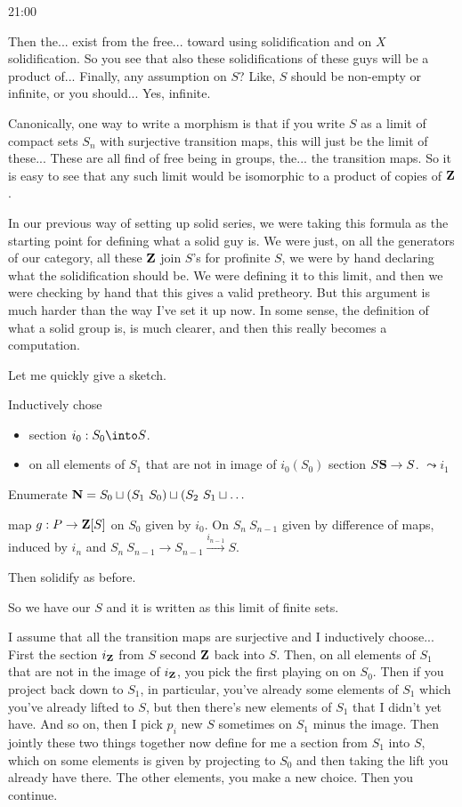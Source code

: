 \begin{unfinished}{21:00}
\begin{sketch}
Then the... exist from the free... toward using solidification and on $X$ solidification. So you see that also these solidifications of these guys will be a product of... Finally, any assumption on $S$? Like, $S$ should be non-empty or infinite, or you should... Yes, infinite.

Canonically, one way to write a morphism is that if you write $S$ as a limit of compact sets $S_n$ with surjective transition maps, this will just be the limit of these... These are all find of free being in groups, the... the transition maps. So it is easy to see that any such limit would be isomorphic to a product of copies of $\Z$.

In our previous way of setting up solid series, we were taking this formula as the starting point for defining what a solid guy is. We were just, on all the generators of our category, all these $\Z$ join $S$'s for profinite $S$, we were by hand declaring what the solidification should be. We were defining it to this limit, and then we were checking by hand that this gives a valid pretheory. But this argument is much harder than the way I've set it up now. In some sense, the definition of what a solid group is, is much clearer, and then this really becomes a computation.

Let me quickly give a sketch. 
\begin{sketch}
Inductively chose 
\begin{itemize}
\item section $i_0 : S_0 \into S$.
\item on all elements of $S_1$ that are not in image of $i_0(S_0)$ section $S \S \to S$.
$\leadsto i_1 $ %
\end{itemize}

Enumerate $\N = S_0 \sqcup (S_1 \ S_0) \sqcup (S_2 \ S_1 \sqcup \ldots$

map $g: P \to \Z[S]$
on $S_0$ given by $i_0$.
On $S_n \ S_{n-1}$ given by difference of maps,
induced by $i_n$ and $S_n \ S_{n-1} \to S_{n-1} \xrightarrow{i_{n-1}} S$.


Then solidify as before.

\end{sketch}
So we have our $S$ and it is written as this limit of finite sets. 


I assume that all the transition maps are surjective and I inductively choose... First the section $i_\Z$ from $S$ second $\Z$ back into $S$. Then, on all elements of $S_1$ that are not in the image of $i_\Z$, you pick the first playing on on $S_0$. Then if you project back down to $S_1$, in particular, you've already some elements of $S_1$ which you've already lifted to $S$, but then there's new elements of $S_1$ that I didn't yet have. 
And so on, then I pick $p_i$ new $S$ sometimes on $S_1$ minus the image. 
Then jointly these two things together now define for me a section from $S_1$ into $S$, which on some elements is given by projecting to $S_0$ and then taking the lift you already have there. The other elements, you make a new choice. Then you continue.


\end{sketch}
\end{unfinished}
